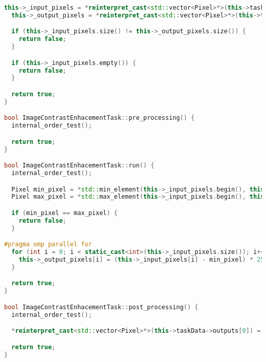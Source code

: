 \documentclass{report}
\begin{document}
\begin{lstlisting}[language=C++,caption=OpenMP версия]
  this->_input_pixels = *reinterpret_cast<std::vector<Pixel>*>(this->taskData->inputs[0]);
  this->_output_pixels = *reinterpret_cast<std::vector<Pixel>*>(this->taskData->outputs[0]);

  if (this->_input_pixels.size() != this->_output_pixels.size()) {
    return false;
  }

  if (this->_input_pixels.empty()) {
    return false;
  }

  return true;
}

bool ImageContrastEnhacementTask::pre_processing() {
  internal_order_test();

  return true;
}

bool ImageContrastEnhacementTask::run() {
  internal_order_test();

  Pixel min_pixel = *std::min_element(this->_input_pixels.begin(), this->_input_pixels.end());
  Pixel max_pixel = *std::max_element(this->_input_pixels.begin(), this->_input_pixels.end());

  if (min_pixel == max_pixel) {
    return false;
  }

#pragma omp parallel for
  for (int i = 0; i < static_cast<int>(this->_input_pixels.size()); i++) {
    this->_output_pixels[i] = (this->_input_pixels[i] - min_pixel) * 255 / (max_pixel - min_pixel);
  }

  return true;
}

bool ImageContrastEnhacementTask::post_processing() {
  internal_order_test();

  *reinterpret_cast<std::vector<Pixel>*>(this->taskData->outputs[0]) = this->_output_pixels;

  return true;
}
\end{lstlisting}

\newpage
\end{document}
